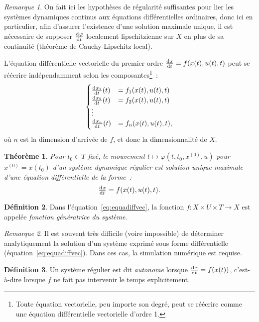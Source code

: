 \documentclass{article}
\newtheorem{thm}{Théorème}[section]
\theoremstyle{definition}
\newtheorem{déf}[thm]{Définition}
\theoremstyle{remark}
\newtheorem*{rmq}{Remarque}
\begin{document}
	\begin{rmq} On fait ici les hypothèses de régularité suffisantes pour lier les systèmes dynamiques continus aux équations différentielles ordinaires, donc
	ici en particulier, afin d'assurer l'existence d'une solution maximale unique, il est nécessaire de supposer $\od \varphi t$ localement lipschitzienne sur $X$
	en plus de sa continuité (théorème de Cauchy-Lipschitz local).
	\end{rmq}

	L'équation différentielle vectorielle du premier ordre $\od xt = f(x(t), u(t), t)$ peut se réécrire indépendamment selon les composantes\footnote{Toute
	équation vectorielle, peu importe son degré, peut se réécrire comme une équation différentielle vectorielle d'ordre 1.}~:
	\[\begin{cases}
		\od {x_1}t(t) &= f_1(x(t), u(t), t) \\
		\od {x_2}t(t) &= f_2(x(t), u(t), t) \\
		\vdots \\
		\od {x_n}t(t) &= f_n(x(t), u(t), t),
	\end{cases}\]
	où $n$ est la dimension d'arrivée de $f$, et donc la dimensionnalité de $X$.

	\begin{thm} Pour $t_0 \in T$ fixé, le mouvement $t \mapsto \varphi(t, t_0, x^{(0)}, u)$ pour $x^{(0)} = x(t_0)$ d'un système dynamique régulier est solution
	unique maximale d'une équation différentielle de la forme~:
	\begin{align}\label{eq:equadiffvec}
		\od xt = f(x(t), u(t), t).
	\end{align}
	\end{thm}

	\begin{déf} Dans l'équation~\eqref{eq:equadiffvec}, la fonction $f : X \times U \times T \to X$ est appelée \textit{fonction génératrice du système}.
	\end{déf}

	\begin{rmq} Il est souvent très difficile (voire impossible) de déterminer analytiquement la solution d'un système exprimé sous forme différentielle
	(équation~\eqref{eq:equadiffvec}). Dans ces cas, la simulation numérique est requise.
	\end{rmq}

	\begin{déf} Un système régulier est dit \textit{autonome} lorsque $\od xt = f(x(t))$, c'est-à-dire lorsque $f$ ne fait pas intervenir le temps explicitement.
	\end{déf}
\end{document}
